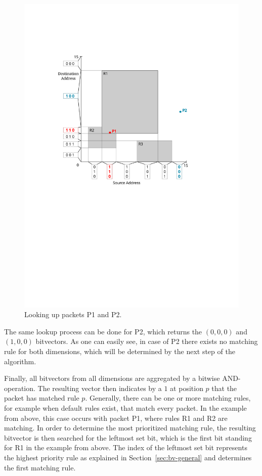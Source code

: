 \documentclass[conference]{IEEEtran}
\begin{document}
\begin{figure}
\centering
\includegraphics[width=0.8\linewidth]{images/bitvector-L1_3}
\caption{Looking up packets P1 and P2.}
\label{fig:bv-lookup}
\vspace{-0.5cm}
\end{figure}

The same lookup process can be done for P2, which returns the $(0, 0, 0)$ and $(1, 0, 0)$ bitvectors.
As one can easily see, in case of P2 there exists no matching rule for both dimensions,
which will be determined by the next step of the algorithm.

Finally, all bitvectors from all dimensions are aggregated by a bitwise AND-operation.
The resulting vector then indicates by a $1$ at position $p$ that the packet has matched rule $p$.
Generally, there can be one or more matching rules, for example when default rules exist, that match every packet.
In the example from above, this case occurs with packet P1, where rules R1 and R2 are matching.
In order to determine the most prioritized matching rule, the resulting 
bitvector is then searched for the leftmost set bit, which is the first bit standing for R1 in the example from above.
The index of the leftmost set bit represents the highest priority rule as explained in Section~\ref{sec:bv-general}
and determines the first matching rule.
\end{document}
